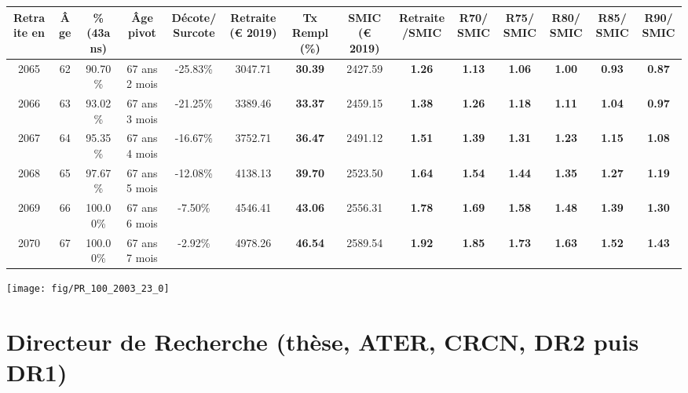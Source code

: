 \begin{adjustbox}{max width=\textwidth} 
\begin{tabular}[htb]{|c|c||c|c|c||c|c||c|c||c|c|c|c|c|} 
\hline 
 Retraite en &  Âge &  \%(43ans) &  Âge pivot &  Décote/Surcote &  Retraite (\euro{} 2019) &  Tx Rempl(\%) &  SMIC (\euro{} 2019) &  Retraite/SMIC &  R70/SMIC &  R75/SMIC &  R80/SMIC &  R85/SMIC &  R90/SMIC \\ 
\hline \hline 
 2065 &  62 &  90.70\% &  67 ans 2 mois &  -25.83\% &  3047.71 &  {\bf 30.39} &  2427.59 &  {\bf 1.26} &  {\bf 1.13} &  {\bf 1.06} &  {\bf {\color{red} 1.00}} &  {\bf {\color{red} 0.93}} &  {\bf {\color{red} 0.87}} \\ 
\hline 
 2066 &  63 &  93.02\% &  67 ans 3 mois &  -21.25\% &  3389.46 &  {\bf 33.37} &  2459.15 &  {\bf 1.38} &  {\bf 1.26} &  {\bf 1.18} &  {\bf 1.11} &  {\bf 1.04} &  {\bf {\color{red} 0.97}} \\ 
\hline 
 2067 &  64 &  95.35\% &  67 ans 4 mois &  -16.67\% &  3752.71 &  {\bf 36.47} &  2491.12 &  {\bf 1.51} &  {\bf 1.39} &  {\bf 1.31} &  {\bf 1.23} &  {\bf 1.15} &  {\bf 1.08} \\ 
\hline 
 2068 &  65 &  97.67\% &  67 ans 5 mois &  -12.08\% &  4138.13 &  {\bf 39.70} &  2523.50 &  {\bf 1.64} &  {\bf 1.54} &  {\bf 1.44} &  {\bf 1.35} &  {\bf 1.27} &  {\bf 1.19} \\ 
\hline 
 2069 &  66 &  100.00\% &  67 ans 6 mois &  -7.50\% &  4546.41 &  {\bf 43.06} &  2556.31 &  {\bf 1.78} &  {\bf 1.69} &  {\bf 1.58} &  {\bf 1.48} &  {\bf 1.39} &  {\bf 1.30} \\ 
\hline 
 2070 &  67 &  100.00\% &  67 ans 7 mois &  -2.92\% &  4978.26 &  {\bf 46.54} &  2589.54 &  {\bf 1.92} &  {\bf 1.85} &  {\bf 1.73} &  {\bf 1.63} &  {\bf 1.52} &  {\bf 1.43} \\ 
\hline 
\hline 
\end{tabular} 
\end{adjustbox} 
 
 \vspace{0.1cm} 

 {\hspace{-2.2cm}\texttt{[image: fig/PR\_100\_2003\_23\_0]}} 

\newpage 
 
\chapter{Directeur de Recherche (thèse, ATER, CRCN, DR2 puis DR1)} 

